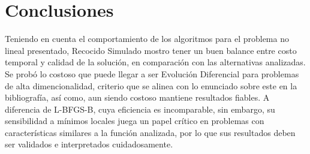 \documentclass[10pt,a4paper,twocolumn]{article}
\begin{document}
	
	\section{Conclusiones}
		Teniendo en cuenta el comportamiento de los algoritmos para el problema no lineal presentado, Recocido Simulado mostro tener un buen balance entre costo temporal y calidad de la solución, en comparación con las alternativas analizadas. Se probó lo costoso que puede llegar a ser Evolución Diferencial para problemas de alta dimencionalidad, criterio que se alinea con lo enunciado sobre este en la bibliografía, así como, aun siendo costoso mantiene resultados fiables. A diferencia de L-BFGS-B, cuya eficiencia es incomparable, sin embargo, su sensibilidad a mínimos locales juega un papel crítico en problemas con características similares a la función analizada, por lo que sus resultados deben ser validados e interpretados cuidadosamente.
	
	
	
	
\end{document}
